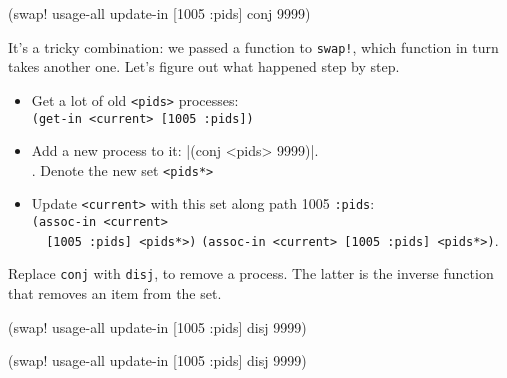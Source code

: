 \else

\begin{english}
  \begin{clojure}
(swap! usage-all update-in [1005 :pids] conj 9999)
  \end{clojure}
\end{english}

\fi

It's a tricky combination: we passed a function to \verb|swap!|, which function in turn takes another one. Let's figure out what happened step by step.

\begin{itemize}

\item
  Get a lot of old \verb|<pids>| processes:\\
  \verb|(get-in <current> [1005 :pids])|

\item
  Add a new process to it: \spverb|(conj <pids> 9999)|.\ifx\DEVICETYPE\MOBILE\ \else\\\fi.
  Denote the new set \verb|<pids*>|

\item
  Update \verb|<current>| with this set along path 1005 \arr{} \verb|:pids|:\\
  \ifx\DEVICETYPE\MOBILE
  \verb|(assoc-in <current>| \\
  \verb|  [1005 :pids] <pids*>)|
  \else
  \verb|(assoc-in <current> [1005 :pids] <pids*>)|.
  \fi

\end{itemize}

\noindent
Replace \verb|conj| with \verb|disj|, to remove a process. The latter is the inverse function that removes an item from the set.


\ifx\DEVICETYPE\MOBILE

\begin{english}
  \begin{clojure}
(swap! usage-all
  update-in [1005 :pids] disj 9999)
  \end{clojure}
\end{english}

\else

\begin{english}
  \begin{clojure}
(swap! usage-all update-in [1005 :pids] disj 9999)
  \end{clojure}
\end{english}

